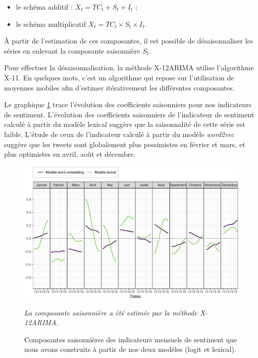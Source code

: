 \documentclass[11pt,french,french]{article}
\begin{document}
\begin{itemize}
\item
  le schéma additif : \(X_t=TC_t+S_t+I_t\) ;
\item
  le schéma multiplicatif \(X_t=TC_t\times S_t\times I_t\).
\end{itemize}

À partir de l'estimation de ces composantes, il est possible de
désaisonnaliser les séries en enlevant la composante saisonnière
\(S_t\).

Pour effectuer la désaisonnalisation, la méthode X-12ARIMA utilise
l'algorithme X-11. En quelques mots, c'est un algorithme qui repose sur
l'utilisation de moyennes mobiles afin d'estimer itérativement les
différentes composantes.

Le graphique \ref{fig:coefcvscjo} trace l'évolution des coefficients
saisonniers pour nos indicateurs de sentiment. L'évolution des
coefficients saisonniers de l'indicateur de sentiment calculé à partir
du modèle lexical suggère que la saisonnalité de cette série est faible.
L'étude de ceux de l'indicateur calculé à partir du modèle
\emph{word2vec} suggère que les tweets sont globalement plus pessimistes
en février et mars, et plus optimistes en avril, août et décembre.

\begin{figure}[htp]
{\centering\includegraphics[width = \textwidth]{img/rmd-graphCoefCVS-1}}
\captionsetup{margin=0cm,format=hang,justification=justified}
\caption{Composantes saisonnières des indicateurs mensuels de sentiment que nous avons construits à partir de nos deux modèles (logit et lexical).}\label{fig:coefcvscjo}
\footnotesize

\emph{La composante saisonnière a été estimée par la méthode X-12ARIMA.}
\end{figure}
\end{document}
